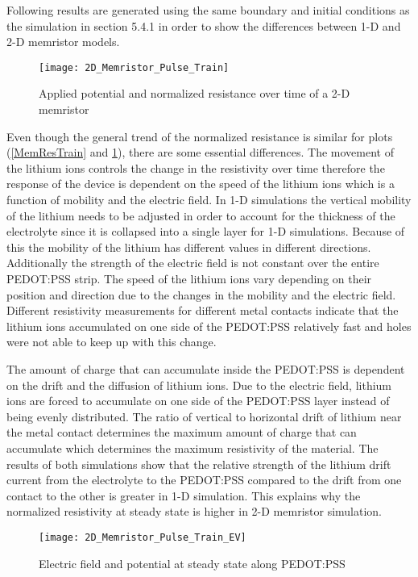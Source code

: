 \begin{doublespace}
Following results are generated using the same boundary and initial conditions as the simulation in section 5.4.1 in order to show the differences between 1-D and 2-D memristor models.

\begin{figure}[!htp]
\centering
\texttt{[image: 2D\_Memristor\_Pulse\_Train]}
\caption{Applied potential and normalized resistance over time of a 2-D memristor} 
\label{2D_mem_train}
\end{figure}

 Even though the general trend of the normalized resistance is similar for plots (\ref{MemResTrain} and \ref{2D_mem_train}), there are some essential differences. The movement of the lithium ions controls the change in the resistivity over time therefore the response of the device is dependent on the speed of the lithium ions which is a function of mobility and the electric field. In 1-D simulations the vertical mobility of the lithium needs to be adjusted in order to account for the thickness of the electrolyte since it is collapsed into a single layer for 1-D simulations. Because of this the mobility of the lithium has different values in different directions. Additionally the strength of the electric field is not constant over the entire PEDOT:PSS strip. The speed of the lithium ions vary depending on their position and direction due to the changes in the mobility and the electric field. Different resistivity measurements for different metal contacts indicate that the lithium ions accumulated on one side of the PEDOT:PSS relatively fast and holes were not able to keep up with this change. 
 
The amount of charge that can accumulate inside the PEDOT:PSS is dependent on the drift and the diffusion of lithium ions. Due to the electric field, lithium ions are forced to accumulate on one side of the PEDOT:PSS layer instead of being evenly distributed. The ratio of vertical to horizontal drift of lithium near the metal contact determines the maximum amount of charge that can accumulate which determines the maximum resistivity of the material. The results of both simulations show that the relative strength of the lithium drift current from the electrolyte to the PEDOT:PSS compared to the drift from one contact to the other is greater in 1-D simulation. This explains why the normalized resistivity at steady state is higher in 2-D memristor simulation. 

\begin{figure}[!htp]
\centering
\texttt{[image: 2D\_Memristor\_Pulse\_Train\_EV]}
\caption{Electric field and potential at steady state along PEDOT:PSS} 
\label{2D_E_V_ss}
\end{figure}


\end{doublespace}
